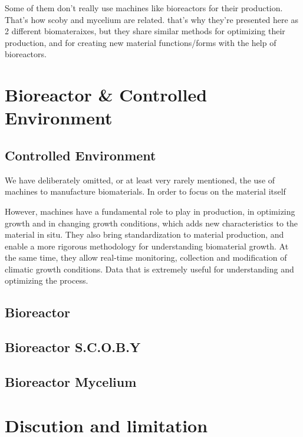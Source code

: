 Some of them don't really use machines like bioreactors for their production.  
That's how scoby and mycelium are related. that's why they're presented here as 2 different biomateraixes, but they share similar methods for optimizing their production, and for creating new material functions/forms with the help of bioreactors. 
















\section{Bioreactor \& Controlled Environment }

\subsection{Controlled Environment} 

We have deliberately omitted, or at least very rarely mentioned, the use of machines to manufacture biomaterials. In order to focus on the material itself 
 
However, machines have a fundamental role to play in production, in optimizing growth and in changing growth conditions, which adds new characteristics to the material in situ.  
They also bring standardization to material production, and enable a more rigorous methodology for understanding biomaterial growth.
At the same time, they allow real-time monitoring, collection and modification of climatic growth conditions. Data that is extremely useful for understanding and optimizing the process.






\subsection{Bioreactor}
\subsection{Bioreactor S.C.O.B.Y}
\subsection{Bioreactor Mycelium}



\section{Discution and limitation}